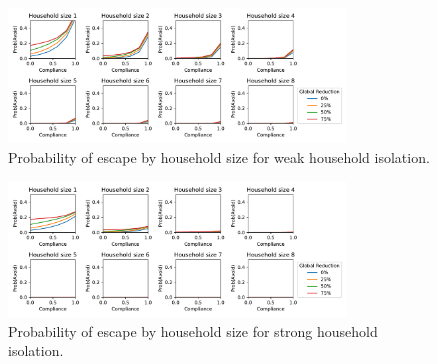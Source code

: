 \documentclass[10pt,a4paper]{article}
\begin{document}
\begin{figure}[H]
\begin{center}
\includegraphics[width=0.8\textwidth]{prob_avoid_weak.pdf}
\end{center}
\caption{Probability of escape by household size for weak household isolation.}
\end{figure}

\begin{figure}[H]
\begin{center}
\includegraphics[width=0.8\textwidth]{prob_avoid_strong.pdf}
\end{center}
\caption{Probability of escape by household size for strong household isolation.}
\end{figure}

\clearpage
\end{document}
